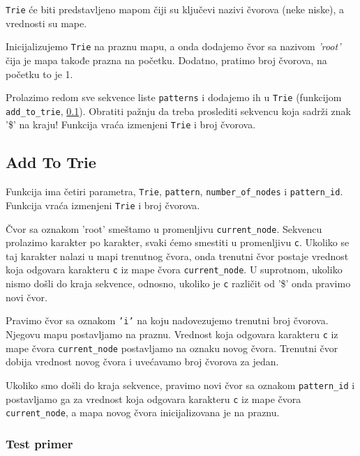 \texttt{Trie} će biti predstavljeno mapom čiji su ključevi nazivi čvorova (neke niske), a vrednosti su mape.

Inicijalizujemo \texttt{Trie} na praznu mapu, a onda dodajemo čvor sa nazivom \textit{'root'} čija je mapa takođe prazna na početku. Dodatno, pratimo broj čvorova, na početku to je 1.

Prolazimo redom sve sekvence liste \texttt{patterns} i dodajemo ih u \texttt{Trie} (funkcijom \texttt{add\_to\_trie}, \ref{addToTrie}). Obratiti pažnju da treba proslediti sekvencu koja sadrži znak '\$' na kraju! Funkcija vraća izmenjeni \texttt{Trie} i broj čvorova.





\subsection{Add To Trie}
\label{addToTrie}

Funkcija ima četiri parametra, \texttt{Trie}, \texttt{pattern}, \texttt{number\_of\_nodes} i \texttt{pattern\_id}. Funkcija vraća izmenjeni \texttt{Trie} i broj čvorova.

Čvor sa oznakom 'root' smeštamo u promenljivu \texttt{current\_node}. Sekvencu prolazimo karakter po karakter, svaki ćemo smestiti u promenljivu \texttt{c}. Ukoliko se taj karakter nalazi u mapi trenutnog čvora, onda trenutni čvor postaje vrednost koja odgovara karakteru \texttt{c} iz mape čvora \texttt{current\_node}. U suprotnom, ukoliko nismo došli do kraja sekvence, odnosno, ukoliko je \texttt{c} različit od '\$' onda pravimo novi čvor.

Pravimo čvor sa oznakom \texttt{'i'} na koju nadovezujemo trenutni broj čvorova. Njegovu mapu postavljamo na praznu. Vrednost koja odgovara karakteru \texttt{c} iz mape čvora \texttt{current\_node} postavljamo na oznaku novog čvora. Trenutni čvor dobija vrednost novog čvora i uvećavamo broj čvorova za jedan.

Ukoliko smo došli do kraja sekvence, pravimo novi čvor sa oznakom \texttt{pattern\_id} i postavljamo ga za vrednost koja odgovara karakteru \texttt{c} iz mape čvora \texttt{current\_node}, a mapa novog čvora inicijalizovana je na praznu.




\subsubsection{Test primer}

